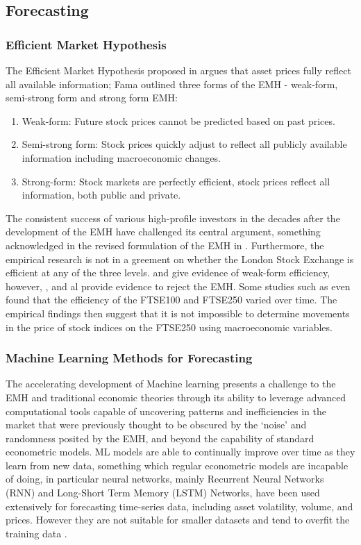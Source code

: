 \documentclass[11pt,a4paper]{article}
\newcommand{\citeboth}[1]{\citeauthor{#1} \citep{#1}}
\begin{document}
\subsection{Forecasting}


\subsubsection{Efficient Market Hypothesis}

The Efficient Market Hypothesis proposed in \citeboth{fama1970} argues that asset prices fully 
reflect all available information; Fama outlined three forms of the EMH - 
weak-form, semi-strong form and strong form EMH:
\begin{enumerate}
    \item Weak-form: Future stock prices cannot be predicted based on past prices.
    \item Semi-strong form: Stock prices quickly adjust to reflect all publicly available information including macroeconomic changes.  
    \item Strong-form: Stock markets are perfectly efficient, stock prices reflect all information, both public and private.
\end{enumerate}

The consistent success of various high-profile investors in the decades 
after the development of the EMH have challenged 
its central argument, something acknowledged in the revised formulation of the EMH 
in \citeboth{fama1991}. Furthermore, the empirical research is not in a
greement on whether the London Stock Exchange is efficient at any of the three levels. 
\citeboth{libberton2010} and \citeboth{rounaghi} give evidence of weak-form efficiency,
however, \citeboth{borges2010}, \citeboth{asghar2023} and \citeboth{bhavsar2015} al provide evidence to reject the EMH. 
Some studies such as \citeboth{rosini2020} even found that the 
efficiency of the FTSE100 and FTSE250 varied over time. The empirical findings then suggest 
that it is not impossible to determine movements in the 
price of stock indices on the FTSE250 using macroeconomic variables.

\subsubsection{Machine Learning Methods for Forecasting}

The accelerating development of Machine learning presents a challenge to the 
EMH and traditional economic theories through its ability to leverage advanced 
computational tools capable of uncovering patterns and inefficiencies in the
market that were previously thought to be obscured by the ‘noise’ and randomness 
posited by the EMH, and beyond the capability of standard econometric models. 
ML models are able to continually improve over time as they learn from new data, 
something which regular econometric models are incapable of doing, in particular 
neural networks, mainly Recurrent Neural Networks (RNN) and Long-Short Term 
Memory (LSTM) Networks, have been used extensively for forecasting time-series data, 
including asset volatility, volume, and prices. However they are not suitable for smaller datasets
and tend to overfit the training data \citep{foster1992}.
\end{document}
